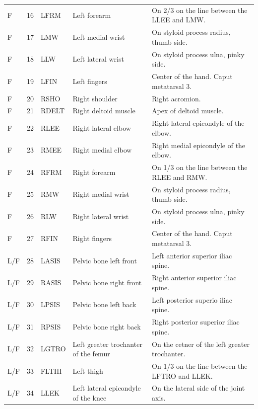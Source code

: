 \documentclass[fleqn,12pt]{wlpeerj}
\begin{document}
\begin{table}
\begin{tabular}{lrlll}
    F   & 16 & LFRM  & Left forearm                          & On 2/3 on the line between the LLEE and LMW. \\
    F   & 17 & LMW   & Left medial wrist                     & On styloid process radius, thumb side. \\
    F   & 18 & LLW   & Left lateral wrist                    & On styloid process ulna, pinky side. \\
    F   & 19 & LFIN  & Left fingers                          & Center of the hand. Caput metatarsal 3. \\
    F   & 20 & RSHO  & Right shoulder                        & Right acromion. \\
    F   & 21 & RDELT & Right deltoid muscle                  & Apex of deltoid muscle. \\
    F   & 22 & RLEE  & Right lateral elbow                   & Right lateral epicondyle of the elbow. \\
    F   & 23 & RMEE  & Right medial elbow                    & Right medial epicondyle of the elbow. \\
    F   & 24 & RFRM  & Right forearm                         & On 1/3 on the line between the RLEE and RMW. \\
    F   & 25 & RMW   & Right medial wrist                    & On styloid process radius, thumb side. \\
    F   & 26 & RLW   & Right lateral wrist                   & On styloid process ulna, pinky side. \\
    F   & 27 & RFIN  & Right fingers                         & Center of the hand. Caput metatarsal 3. \\
    L/F & 28 & LASIS & Pelvic bone left front                & Left anterior superior iliac spine. \\
    L/F & 29 & RASIS & Pelvic bone right front               & Right anterior superior iliac spine. \\
    L/F & 30 & LPSIS & Pelvic bone left back                 & Left posterior superio iliac spine. \\
    L/F & 31 & RPSIS & Pelvic bone right back                & Right posterior superior iliac spine. \\
    L/F & 32 & LGTRO & Left greater trochanter of the femur  & On the cetner of the left greater trochanter. \\
    L/F & 33 & FLTHI & Left thigh                            & On 1/3 on the line between the LFTRO and LLEK. \\
    L/F & 34 & LLEK  & Left lateral epicondyle of the knee   & On the lateral side of the joint axis. \\

\end{tabular}
\end{table}
\end{document}
